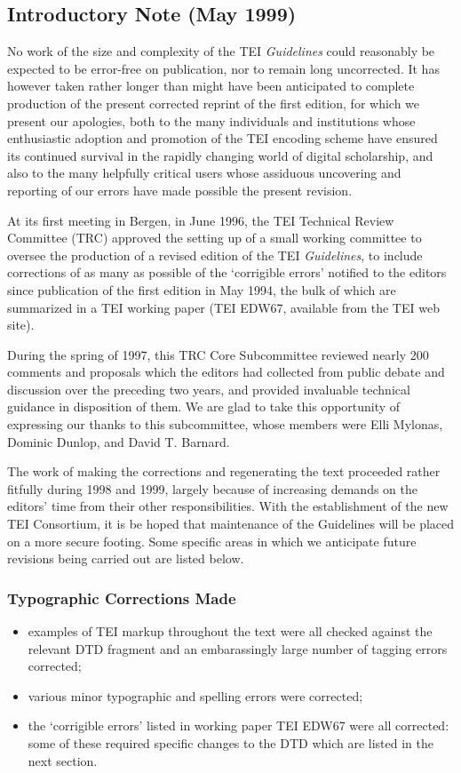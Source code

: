 \subsection[{Introductory Note (May 1999)}]{Introductory Note (May 1999)}\label{ppf}\par
No work of the size and complexity of the TEI \textit{Guidelines} could reasonably be expected to be error-free on publication, nor to remain long uncorrected. It has however taken rather longer than might have been anticipated to complete production of the present corrected reprint of the first edition, for which we present our apologies, both to the many individuals and institutions whose enthusiastic adoption and promotion of the TEI encoding scheme have ensured its continued survival in the rapidly changing world of digital scholarship, and also to the many helpfully critical users whose assiduous uncovering and reporting of our errors have made possible the present revision.\par
At its first meeting in Bergen, in June 1996, the TEI Technical Review Committee (TRC) approved the setting up of a small working committee to oversee the production of a revised edition of the TEI \textit{Guidelines}, to include corrections of as many as possible of the `corrigible errors' notified to the editors since publication of the first edition in May 1994, the bulk of which are summarized in a TEI working paper (TEI EDW67, available from the TEI web site).\par
During the spring of 1997, this TRC Core Subcommittee reviewed nearly 200 comments and proposals which the editors had collected from public debate and discussion over the preceding two years, and provided invaluable technical guidance in disposition of them. We are glad to take this opportunity of expressing our thanks to this subcommittee, whose members were Elli Mylonas, Dominic Dunlop, and David T. Barnard. \par
The work of making the corrections and regenerating the text proceeded rather fitfully during 1998 and 1999, largely because of increasing demands on the editors' time from their other responsibilities. With the establishment of the new TEI Consortium, it is be hoped that maintenance of the Guidelines will be placed on a more secure footing. Some specific areas in which we anticipate future revisions being carried out are listed below. 
\subsubsection[{Typographic Corrections Made}]{Typographic Corrections Made}\label{ppf-tcm}\begin{itemize}
\item examples of TEI markup throughout the text were all checked against the relevant DTD fragment and an embarassingly large number of tagging errors corrected;
\item various minor typographic and spelling errors were corrected;
\item the ‘corrigible errors’ listed in working paper TEI EDW67 were all corrected: some of these required specific changes to the DTD which are listed in the next section.
\end{itemize} 
